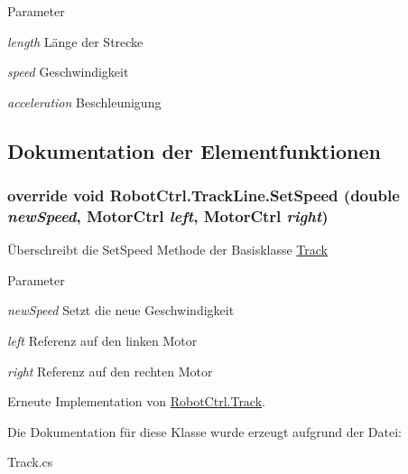 \begin{DoxyParams}{Parameter}
\item[{\em length}]L\"{a}nge der Strecke \item[{\em speed}]Geschwindigkeit \item[{\em acceleration}]Beschleunigung \end{DoxyParams}


\subsection{Dokumentation der Elementfunktionen}
\hypertarget{class_robot_ctrl_1_1_track_line_ad73ae0e8f7aea1765834ab90f5bd6b23}{
\subsubsection[{SetSpeed}]{\setlength{\rightskip}{0pt plus 5cm}override void RobotCtrl.TrackLine.SetSpeed (double {\em newSpeed}, \/  {\bf MotorCtrl} {\em left}, \/  {\bf MotorCtrl} {\em right})}}
\label{class_robot_ctrl_1_1_track_line_ad73ae0e8f7aea1765834ab90f5bd6b23}
\"{U}berschreibt die SetSpeed Methode der Basisklasse \hyperlink{class_robot_ctrl_1_1_track}{Track}


\begin{DoxyParams}{Parameter}
\item[{\em newSpeed}]Setzt die neue Geschwindigkeit \item[{\em left}]Referenz auf den linken Motor \item[{\em right}]Referenz auf den rechten Motor \end{DoxyParams}


Erneute Implementation von \hyperlink{class_robot_ctrl_1_1_track_a9abc3ccf4bf1d9db8d461f2cb4b4b0d3}{RobotCtrl.Track}.



Die Dokumentation für diese Klasse wurde erzeugt aufgrund der Datei:\begin{DoxyCompactItemize}
\item 
Track.cs\end{DoxyCompactItemize}
